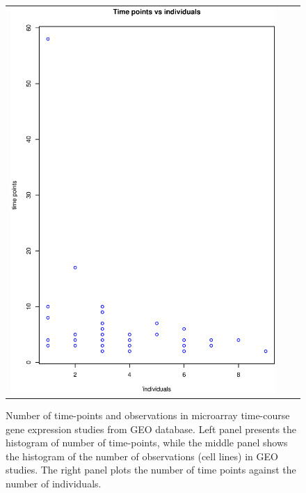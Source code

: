 \begin{figure}[h!]
\begin{tabular}{ccc}
\includegraphics[scale=0.24]{GEOscat.eps}\\
\end{tabular}
\caption{Number of time-points and observations in microarray time-course gene expression studies from GEO database. Left panel presents the histogram of number of time-points, while the middle panel shows the histogram of the number of observations (cell lines) in GEO studies. The right panel plots the number of time points against the number of individuals.}
\label{figSM:GEOhist}
\end{figure}







